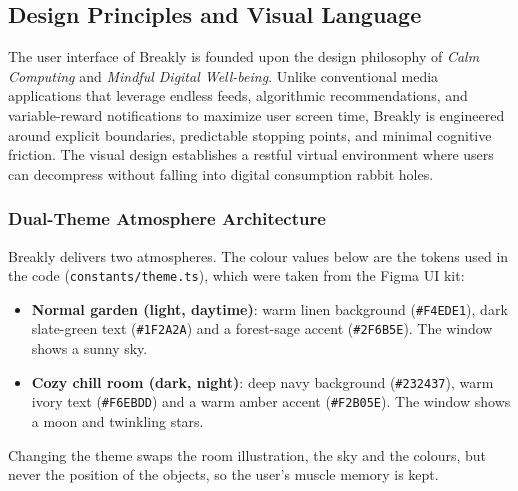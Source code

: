 \subsection{Design Principles and Visual Language}
\label{sec:design-principles}

The user interface of Breakly is founded upon the design philosophy of \textit{Calm Computing} and \textit{Mindful Digital Well-being}. Unlike conventional media applications that leverage endless feeds, algorithmic recommendations, and variable-reward notifications to maximize user screen time, Breakly is engineered around explicit boundaries, predictable stopping points, and minimal cognitive friction. The visual design establishes a restful virtual environment where users can decompress without falling into digital consumption rabbit holes.

\subsubsection{Dual-Theme Atmosphere Architecture}
Breakly delivers two atmospheres. The colour values below are the tokens used in the code (\texttt{constants/theme.ts}), which were taken from the Figma UI kit:
\begin{itemize}[leftmargin=1.5em, itemsep=2pt]
  \item \textbf{Normal garden (light, daytime)}: warm linen background (\texttt{\#F4EDE1}), dark slate-green text (\texttt{\#1F2A2A}) and a forest-sage accent (\texttt{\#2F6B5E}). The window shows a sunny sky.
  \item \textbf{Cozy chill room (dark, night)}: deep navy background (\texttt{\#232437}), warm ivory text (\texttt{\#F6EBDD}) and a warm amber accent (\texttt{\#F2B05E}). The window shows a moon and twinkling stars.
\end{itemize}
Changing the theme swaps the room illustration, the sky and the colours, but never the position of the objects, so the user's muscle memory is kept.

